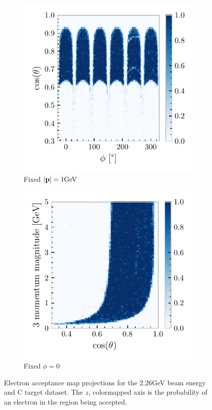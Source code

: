 \documentclass[a4paper,12pt]{article}
\begin{document}
\begin{figure}[H]
    \centering
    \begin{subfigure}[b]{0.45\textwidth}
        \centering
        \includegraphics{figures/python/el_acc1.pdf}
        \caption{Fixed $|\vb{p}| = 1\si{GeV}$}
    \end{subfigure}
    \hspace{0.5em}
    \begin{subfigure}[b]{0.45\textwidth}
        \centering
        \includegraphics{figures/python/el_acc2.pdf}
        \caption{Fixed $\phi = 0$}
    \end{subfigure}
    \caption{
        Electron acceptance map projections for the 2.26\si{GeV} beam energy and C target dataset.
        The $z$, colormapped axis is the probability of an electron in the region being accepted.
    }\label{fig:acc_map}
\end{figure}
\end{document}
